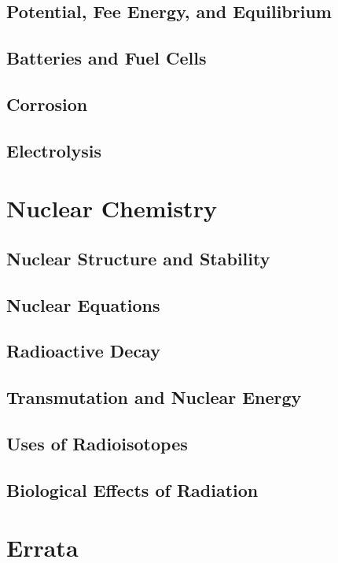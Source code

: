 \documentclass[12pt, openany, letterpaper]{memoir}
\begin{document}
\section{Potential, Fee Energy, and Equilibrium}

\section{Batteries and Fuel Cells}

\section{Corrosion}

\section{Electrolysis}

\setcounter{chapter}{20}
\chapter{Nuclear Chemistry}

\section{Nuclear Structure and Stability}

\section{Nuclear Equations}

\section{Radioactive Decay}

\section{Transmutation and Nuclear Energy}

\section{Uses of Radioisotopes}

\section{Biological Effects of Radiation}

\backmatter
\chapter{Errata}
\end{document}
